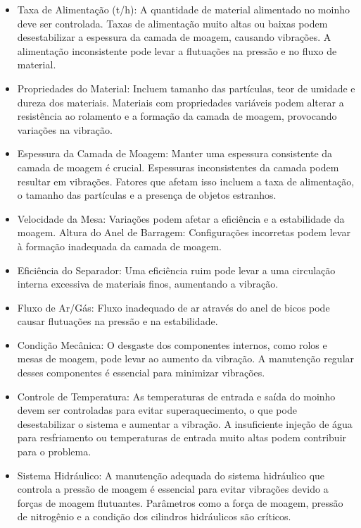 \begin{itemize}

\item Taxa de Alimentação (t/h): A quantidade de material alimentado no moinho deve ser controlada. Taxas de alimentação muito altas ou baixas podem desestabilizar a espessura da camada de moagem, causando vibrações. A alimentação inconsistente pode levar a flutuações na pressão e no fluxo de material.

\item Propriedades do Material: Incluem tamanho das partículas, teor de umidade e dureza dos materiais. Materiais com propriedades variáveis podem alterar a resistência ao rolamento e a formação da camada de moagem, provocando variações na vibração.

\item Espessura da Camada de Moagem: Manter uma espessura consistente da camada de moagem é crucial. Espessuras inconsistentes da camada podem resultar em vibrações. Fatores que afetam isso incluem a taxa de alimentação, o tamanho das partículas e a presença de objetos estranhos.

\item Velocidade da Mesa: Variações podem afetar a eficiência e a estabilidade da moagem.
Altura do Anel de Barragem: Configurações incorretas podem levar à formação inadequada da camada de moagem.

\item Eficiência do Separador: Uma eficiência ruim pode levar a uma circulação interna excessiva de materiais finos, aumentando a vibração.

\item Fluxo de Ar/Gás: Fluxo inadequado de ar através do anel de bicos pode causar flutuações na pressão e na estabilidade.

\item Condição Mecânica: O desgaste dos componentes internos, como rolos e mesas de moagem, pode levar ao aumento da vibração. A manutenção regular desses componentes é essencial para minimizar vibrações.

\item Controle de Temperatura: As temperaturas de entrada e saída do moinho devem ser controladas para evitar superaquecimento, o que pode desestabilizar o sistema e aumentar a vibração. A insuficiente injeção de água para resfriamento ou temperaturas de entrada muito altas podem contribuir para o problema.

\item Sistema Hidráulico: A manutenção adequada do sistema hidráulico que controla a pressão de moagem é essencial para evitar vibrações devido a forças de moagem flutuantes. Parâmetros como a força de moagem, pressão de nitrogênio e a condição dos cilindros hidráulicos são críticos.

\end{itemize}


